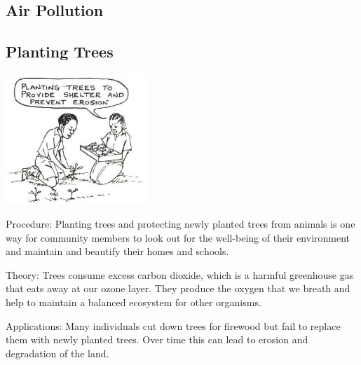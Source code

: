 \begin{multicols}{2}

\section*{Air Pollution} %


\subsection{Planting Trees}

\begin{center}
\includegraphics[width=0.4\textwidth]{./img/source/planting-trees.jpg}
\end{center}

\begin{description*}
\item[Procedure:]{Planting trees and protecting newly planted trees from animals is one way for community members to look out for the well-being of their environment and maintain and beautify their homes and schools.}
\item[Theory:]{Trees consume excess carbon dioxide, which is a harmful greenhouse gas that eats away at our ozone layer. They produce the oxygen that we breath and help to maintain a balanced ecosystem for other organisms. }
\item[Applications:]{Many individuals cut down trees for firewood but fail to replace them with newly planted trees. Over time this can lead to erosion and degradation of the land.}
\end{description*}


\end{multicols}

